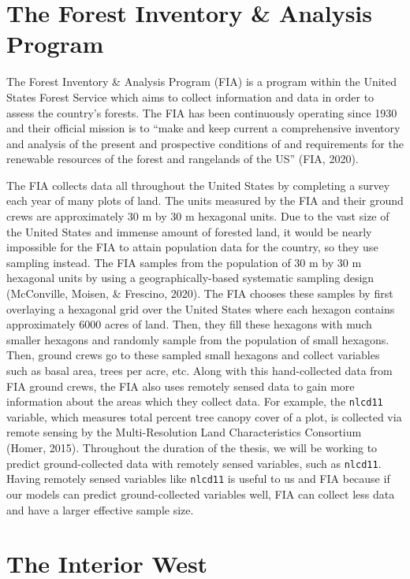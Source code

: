 \documentclass[12pt,twoside]{reedthesis}
\begin{document}
\hypertarget{the-forest-inventory-analysis-program}{%
\section{The Forest Inventory \& Analysis Program}\label{the-forest-inventory-analysis-program}}

The Forest Inventory \& Analysis Program (FIA) is a program within the United States Forest Service which aims to collect information and data in order to assess the country's forests. The FIA has been continuously operating since 1930 and their official mission is to ``make and keep current a comprehensive inventory and analysis of the present and prospective conditions of and requirements for the renewable resources of the forest and rangelands of the US'' (FIA, 2020).

The FIA collects data all throughout the United States by completing a survey each year of many plots of land. The units measured by the FIA and their ground crews are approximately 30 m by 30 m hexagonal units. Due to the vast size of the United States and immense amount of forested land, it would be nearly impossible for the FIA to attain population data for the country, so they use sampling instead. The FIA samples from the population of 30 m by 30 m hexagonal units by using a geographically-based systematic sampling design (McConville, Moisen, \& Frescino, 2020). The FIA chooses these samples by first overlaying a hexagonal grid over the United States where each hexagon contains approximately 6000 acres of land. Then, they fill these hexagons with much smaller hexagons and randomly sample from the population of small hexagons. Then, ground crews go to these sampled small hexagons and collect variables such as basal area, trees per acre, etc. Along with this hand-collected data from FIA ground crews, the FIA also uses remotely sensed data to gain more information about the areas which they collect data. For example, the \texttt{nlcd11} variable, which measures total percent tree canopy cover of a plot, is collected via remote sensing by the Multi-Resolution Land Characteristics Consortium (Homer, 2015). Throughout the duration of the thesis, we will be working to predict ground-collected data with remotely sensed variables, such as \texttt{nlcd11}. Having remotely sensed variables like \texttt{nlcd11} is useful to us and FIA because if our models can predict ground-collected variables well, FIA can collect less data and have a larger effective sample size.

\hypertarget{the-interior-west}{%
\section{The Interior West}\label{the-interior-west}}
\end{document}
